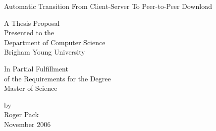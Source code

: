 	\thispagestyle{empty}
	\begin{center}
		{\Large\expandafter{Automatic Transition From Client-Server To Peer-to-Peer Download}}
	\end{center}
	\vfill
	\begin{center}
		A Thesis Proposal\\
		Presented to the\\
		Department of 
			\expandafter{Computer Science}\\
		Brigham Young University
	\end{center}
	\vfill
	\begin{center}
		In Partial Fulfillment\\
		of the Requirements for the Degree\\
		Master of Science
	\end{center}
	\vfill
	\begin{center}
		\rm by\\
		Roger Pack\\
		November 2006\\
	\end{center}\vskip1in\newpage
